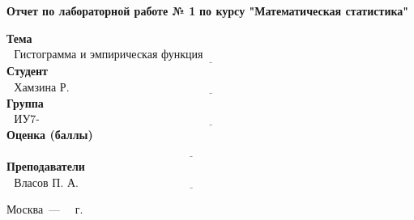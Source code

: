 \begin{titlepage}
	\begin{center}
  		\noindent\begin{minipage}{1.3\textwidth}\centering
  		\Large\textbf{   Отчет по лабораторной работе № 1}\newline
  		\Large\textbf{по курсу "Математическая статистика"}
  		\newline\newline
  		\end{minipage}
	\end{center}
	
	\noindent\textbf{Тема} $\underline{\text{~~Гистограмма и эмпирическая функция распределения~~~~~~~~~~~~~~~~~~~~~~~~~~~~~~~~~~~~~~}}$\newline\newline\newline
	\noindent\textbf{Студент} $\underline{\text{~~Хамзина Р. Р.~~~~~~~~~~~~~~~~~~~~~~~~~~~~~~~~~~~~~~~~~~~~~~~~~~~~~~~~~~~~~~~~~~~~~~~~~~~~~~~~~~~~~~~~~}}$\newline\newline
	\noindent\textbf{Группа} $\underline{\text{~~ИУ7-63Б~~~~~~~~~~~~~~~~~~~~~~~~~~~~~~~~~~~~~~~~~~~~~~~~~~~~~~~~~~~~~~~~~~~~~~~~~~~~~~~~~~~~~~~~~~~~~~~~~}}$\newline\newline
	\noindent\textbf{Оценка (баллы)} $\underline{\text{~~~~~~~~~~~~~~~~~~~~~~~~~~~~~~~~~~~~~~~~~~~~~~~~~~~~~~~~~~~~~~~~~~~~~~~~~~~~~~~~~~~~~~~~~~~~~~~~~~}}$\newline\newline
	\noindent\textbf{Преподаватели} $\underline{\text{~~Власов П. А.~~~~~~~~~~~~~~~~~~~~~~~~~~~~~~~~~~~~~~~~~~~~~~~~~~~~~~~~~~~~~~~~~~~~~~~~~~~~~~~}}$\newline
	
	\begin{center}
		\vfill
		Москва~---~\the\year
		~г.
	\end{center}
	\restoregeometry
\end{titlepage}

